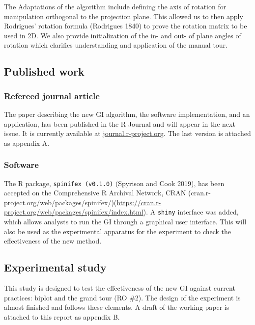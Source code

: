 \documentclass[
  11,
]{article}
\begin{document}
The Adaptations of the algorithm include defining the axis of rotation for manipulation orthogonal to the projection plane. This allowed us to then apply Rodrigues' rotation formula (Rodrigues 1840) to prove the rotation matrix to be used in 2D. We also provide initialization of the in- and out- of plane angles of rotation which clarifies understanding and application of the manual tour.

\hypertarget{published-work}{%
\subsection{Published work}\label{published-work}}

\hypertarget{refereed-journal-article}{%
\subsubsection{Refereed journal article}\label{refereed-journal-article}}

The paper describing the new GI algorithm, the software implementation, and an application, has been published in the R Journal and will appear in the next issue. It is currently available at \href{https://journal.r-project.org/}{journal.r-project.org}. The last version is attached as appendix A.

\hypertarget{software}{%
\subsubsection{Software}\label{software}}

The R package, \texttt{spinifex\ (v0.1.0)} (Spyrison and Cook 2019), has been accepted on the Comprehensive R Archival Network, CRAN (cran.r-project.org/web/packages/spinifex/)(\url{https://cran.r-project.org/web/packages/spinifex/index.html}). A \texttt{shiny} interface was added, which allows analysts to run the GI through a graphical user interface. This will also be used as the experimental apparatus for the experiment to check the effectiveness of the new method.

\hypertarget{sec:expStudy}{%
\subsection{Experimental study}\label{sec:expStudy}}

This study is designed to test the effectiveness of the new GI against current practices: biplot and the grand tour (RO \#2). The design of the experiment is almost finished and follows these elements. A draft of the working paper is attached to this report as appendix B.
\end{document}

